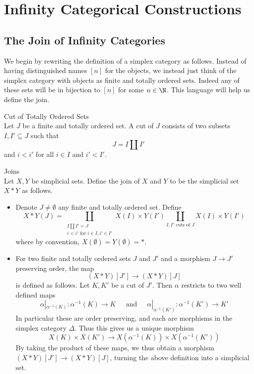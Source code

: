 \documentclass[a4paper]{article}
\begin{document}
\pagebreak
\section{Infinity Categorical Constructions}
\subsection{The Join of Infinity Categories}
We begin by rewriting the definition of a simplex category as follows. Instead of having distinguished names $[n]$ for the objects, we instead just think of the simplex category with objects as finite and totally ordered sets. Indeed any of these sets will be in bijection to $[n]$ for some $n\in\N$. This language will help us define the join. 

\begin{defn}{Cut of Totally Ordered Sets}{}\\ Let $J$ be a finite and totally ordered set. A cut of $J$ consists of two subsets $I,I'\subseteq J$ such that $$J=I\amalg I'$$ and $i<i'$ for all $i\in I$ and $i'<I'$. 
\end{defn}

\begin{defn}{Joins}{}\\ Let $X,Y$ be simplicial sets. Define the join of $X$ and $Y$ to be the simplicial set $X\ast Y$ as follows. 
\begin{itemize}
\item Denote $J\neq\emptyset$ any finite and totally ordered set. Define $$X\ast Y(J)=\coprod_{\substack{I\amalg I'=J\\i<i'\text{ for }i\in I,i'\in I'}}X(I)\times Y(I')\coprod_{I,I'\text{ cuts of }J}X(I)\times Y(I')$$ where by convention, $X(\emptyset)=Y(\emptyset)=\ast$. 
\item For two finite and totally ordered sets $J$ and $J'$ and a morphism $J\to J'$ preserving order, the map $$(X\ast Y)[J']\to(X\ast Y)[J]$$ is defined as follows. Let $K,K'$ be a cut of $J'$. Then $\alpha$ restricts to two well defined maps $$\alpha|_{\alpha^{-1}(K)}:\alpha^{-1}(K)\to K\;\;\;\;\text{ and }\;\;\;\;\alpha|_{\alpha^{-1}(K')}:\alpha^{-1}(K')\to K'$$ In particular these are order preserving, and each are morphisms in the simplex category $\Delta$. Thus this gives us a unique morphism $$X(K)\times X(K')\to X(\alpha^{-1}(K))\times X(\alpha^{-1}(K'))$$ By taking the product of these maps, we thus obtain a morphism $(X\ast Y)[J']\to(X\ast Y)[J]$, turning the above definition into a simplicial set. 
\end{itemize}
\end{defn}
\end{document}
